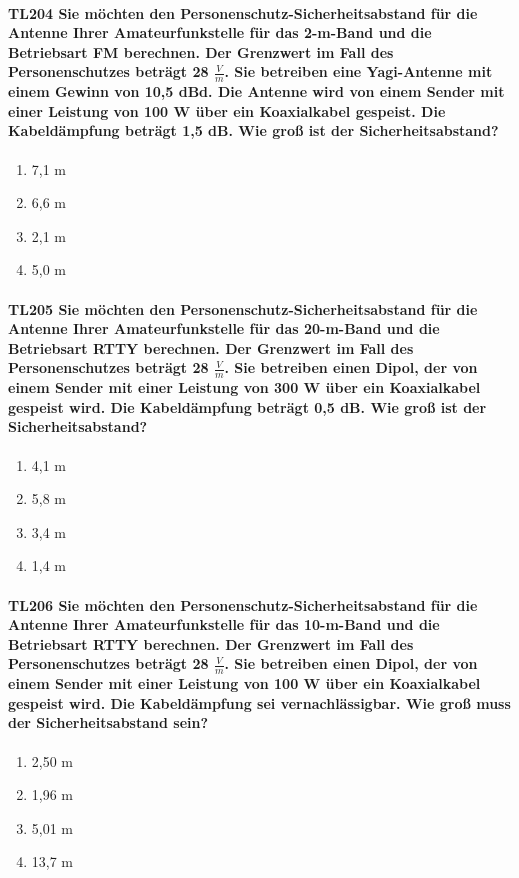 \documentclass[8pt]{article}
\begin{document}
\paragraph*{TL204 Sie möchten den Personenschutz-Sicherheitsabstand für die Antenne Ihrer Amateurfunkstelle für das 2-m-Band und die Betriebsart FM berechnen. Der Grenzwert im Fall des Personenschutzes beträgt 28 $\frac{V}{m}$. Sie betreiben eine Yagi-Antenne mit einem Gewinn von 10,5 dBd. Die Antenne wird von einem Sender mit einer Leistung von 100 W über ein Koaxialkabel gespeist. Die Kabeldämpfung beträgt 1,5 dB. Wie groß ist der Sicherheitsabstand?}
\begin{enumerate}[nolistsep,label=\Alph*]
\item 7,1 m
\item 6,6 m
\item 2,1 m
\item 5,0 m
\end{enumerate}

\paragraph*{TL205 Sie möchten den Personenschutz-Sicherheitsabstand für die Antenne Ihrer Amateurfunkstelle für das 20-m-Band und die Betriebsart RTTY berechnen. Der Grenzwert im Fall des Personenschutzes beträgt 28 $\frac{V}{m}$. Sie betreiben einen Dipol, der von einem Sender mit einer Leistung von 300 W über ein Koaxialkabel gespeist wird. Die Kabeldämpfung beträgt 0,5 dB. Wie groß ist der Sicherheitsabstand?}
\begin{enumerate}[nolistsep,label=\Alph*]
\item 4,1 m
\item 5,8 m
\item 3,4 m
\item 1,4 m
\end{enumerate}

\paragraph*{TL206 Sie möchten den Personenschutz-Sicherheitsabstand für die Antenne Ihrer Amateurfunkstelle für das 10-m-Band und die Betriebsart RTTY berechnen. Der Grenzwert im Fall des Personenschutzes beträgt 28 $\frac{V}{m}$. Sie betreiben einen Dipol, der von einem Sender mit einer Leistung von 100 W über ein Koaxialkabel gespeist wird. Die Kabeldämpfung sei vernachlässigbar. Wie groß muss der Sicherheitsabstand sein?}
\begin{enumerate}[nolistsep,label=\Alph*]
\item 2,50 m
\item 1,96 m
\item 5,01 m
\item 13,7 m
\end{enumerate}
\end{document}
